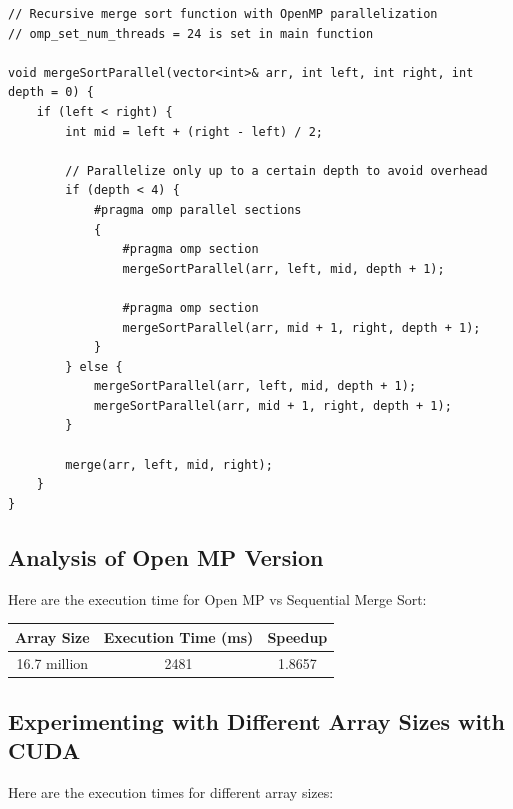 \documentclass{article}
\begin{document}
\begin{lstlisting}
// Recursive merge sort function with OpenMP parallelization
// omp_set_num_threads = 24 is set in main function

void mergeSortParallel(vector<int>& arr, int left, int right, int depth = 0) {
    if (left < right) {
        int mid = left + (right - left) / 2;
        
        // Parallelize only up to a certain depth to avoid overhead
        if (depth < 4) {
            #pragma omp parallel sections
            {
                #pragma omp section
                mergeSortParallel(arr, left, mid, depth + 1);
                
                #pragma omp section
                mergeSortParallel(arr, mid + 1, right, depth + 1);
            }
        } else {
            mergeSortParallel(arr, left, mid, depth + 1);
            mergeSortParallel(arr, mid + 1, right, depth + 1);
        }
        
        merge(arr, left, mid, right);
    }
}
\end{lstlisting}

\subsection*{Analysis of Open MP Version}
Here are the execution time for Open MP  vs Sequential Merge Sort:

\begin{center}
  \begin{tabular}{|c|c|c|}
    \hline
    \textbf{Array Size} & \textbf{Execution Time (ms)} & \textbf{Speedup} \\
    \hline

    16.7 million & 2481 & 1.8657 \\
    
    \hline
  \end{tabular}
\end{center}

\subsection*{Experimenting with Different Array Sizes with CUDA}
Here are the execution times for different array sizes:
\end{document}
